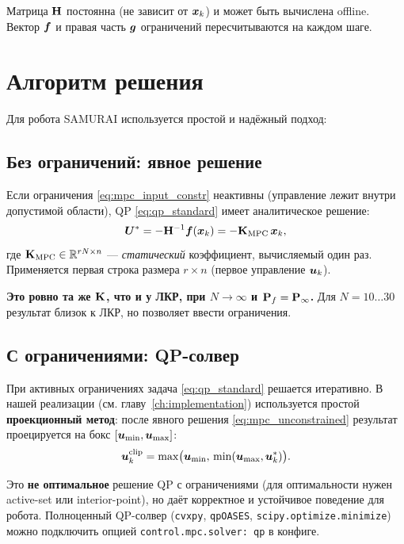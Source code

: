 Матрица $\mathbf{H}$ постоянна (не зависит от $\bm{x}_k$) и может быть
вычислена offline. Вектор $\bm{f}$ и правая часть $\bm{g}$
ограничений пересчитываются на каждом шаге.

\section{Алгоритм решения}
\label{sec:mpc_algorithm}

Для робота SAMURAI используется простой и надёжный подход:

\subsection{Без ограничений: явное решение}

Если ограничения \eqref{eq:mpc_input_constr} неактивны
(управление лежит внутри допустимой области), QP \eqref{eq:qp_standard}
имеет аналитическое решение:
\begin{equation}
  \bm{U}^* = -\mathbf{H}^{-1}\bm{f}(\bm{x}_k) = -\mathbf{K}_{\text{MPC}}\,\bm{x}_k,
  \label{eq:mpc_unconstrained}
\end{equation}
где $\mathbf{K}_{\text{MPC}} \in \mathbb{R}^{rN \times n}$ ---
\emph{статический} коэффициент, вычисляемый один раз. Применяется первая
строка размера $r \times n$ (первое управление $\bm{u}_k$).

\textbf{Это ровно та же $\mathbf{K}$, что и у ЛКР, при $N\to\infty$ и
$\mathbf{P}_f = \mathbf{P}_\infty$.} Для $N = 10\ldots 30$ результат
близок к ЛКР, но позволяет ввести ограничения.

\subsection{С ограничениями: QP-солвер}

При активных ограничениях задача \eqref{eq:qp_standard} решается
итеративно. В нашей реализации (см. главу~\ref{ch:implementation})
используется простой \textbf{проекционный метод}: после явного решения
\eqref{eq:mpc_unconstrained} результат проецируется на бокс
$[\bm{u}_{\min}, \bm{u}_{\max}]$:
\begin{equation}
  \bm{u}_k^{\text{clip}} = \max\!\big(\bm{u}_{\min},\,\min(\bm{u}_{\max}, \bm{u}_k^*)\big).
  \label{eq:projection}
\end{equation}

\begin{notebox}
Это \textbf{не оптимальное} решение QP с ограничениями (для оптимальности
нужен active-set или interior-point), но даёт корректное и устойчивое
поведение для робота. Полноценный QP-солвер (\texttt{cvxpy}, \texttt{qpOASES},
\texttt{scipy.optimize.minimize}) можно подключить опцией
\texttt{control.mpc.solver: qp} в конфиге.
\end{notebox}

